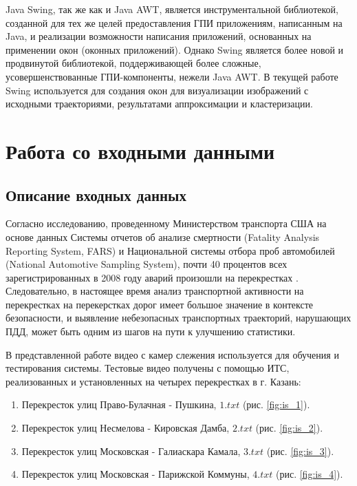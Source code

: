 Java Swing, так же как и Java AWT, является инструментальной библиотекой, созданной для тех же целей предоставления ГПИ приложениям, написанным на Java, и реализации возможности написания приложений, основанных на применении окон (оконных приложений). Однако Swing является более новой и продвинутой библиотекой, поддерживающей более сложные, усовершенствованные ГПИ-компоненты, нежели Java AWT. В текущей работе Swing используется для создания окон для визуализации изображений с исходными траекториями, результатами аппроксимации и кластеризации.

\section{Работа со входными данными}
\subsection{Описание входных данных}

Согласно исследованию, проведенному Министерством транспорта США на основе данных Системы отчетов об анализе смертности (Fatality Analysis Reporting System, FARS) и Национальной системы отбора проб автомобилей (National Automotive Sampling System), почти 40 процентов всех зарегистрированных в 2008 году аварий произошли на перекрестках \cite{inproceedings:10_cfi}. Следовательно, в настоящее время анализ транспортной активности на перекрестках на перекерстках дорог имеет большое значение в контексте безопасности, и выявление небезопасных транспортных траекторий, нарушающих ПДД, может быть одним из шагов на пути к улучшению статистики.

В представленной работе видео с камер слежения используется для обучения и тестирования системы. Тестовые видео получены с помощью ИТС, реализованных и установленных на четырех перекрестках в г. Казань:

\begin{enumerate}
	\setlength\itemsep{-0.5em}
	\item Перекресток улиц Право-Булачная - Пушкина, $1.txt$ (рис. \ref{fig:is_1}).
	\item Перекресток улиц Несмелова - Кировская Дамба, $2.txt$ (рис. \ref{fig:is_2}).
	\item Перекресток улиц Московская - Галиаскара Камала, $3.txt$ (рис. \ref{fig:is_3}).
	\item Перекресток улиц Московская - Парижской Коммуны, $4.txt$ (рис. \ref{fig:is_4}).
\end{enumerate}

